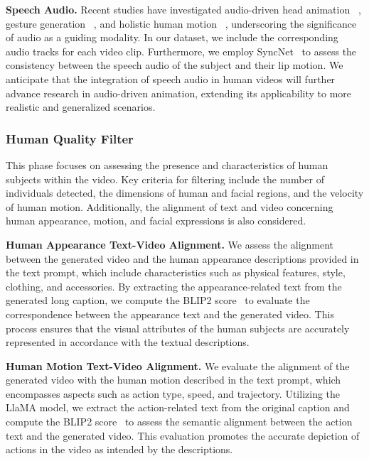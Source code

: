 \noindent\textbf{Speech Audio.}  
Recent studies have investigated audio-driven head animation ~\cite{xu2024hallo,xu2024vasa,he2023gaia}, gesture generation ~\cite{yang2023qpgesture,zhu2023taming}, and holistic human motion ~\cite{corona2024vlogger,wang2024dance}, underscoring the significance of audio as a guiding modality. 
In our dataset, we include the corresponding audio tracks for each video clip. 
Furthermore, we employ SyncNet~\cite{raina2022syncnet} to assess the consistency between the speech audio of the subject and their lip motion. 
We anticipate that the integration of speech audio in human videos will further advance research in audio-driven animation, extending its applicability to more realistic and generalized scenarios.





\subsubsection{Human Quality Filter}
\label{sec:caption_refine}

This phase focuses on assessing the presence and characteristics of human subjects within the video. Key criteria for filtering include the number of individuals detected, the dimensions of human and facial regions, and the velocity of human motion. Additionally, the alignment of text and video concerning human appearance, motion, and facial expressions is also considered.






\noindent\textbf{Human Appearance Text-Video Alignment.}
We assess the alignment between the generated video and the human appearance descriptions provided in the text prompt, which include characteristics such as physical features, style, clothing, and accessories. 
By extracting the appearance-related text from the generated long caption, we compute the BLIP2 score~\cite{li2023blip} to evaluate the correspondence between the appearance text and the generated video. 
This process ensures that the visual attributes of the human subjects are accurately represented in accordance with the textual descriptions.






\noindent\textbf{Human Motion Text-Video Alignment.}
We evaluate the alignment of the generated video with the human motion described in the text prompt, which encompasses aspects such as action type, speed, and trajectory. 
Utilizing the LlaMA model, we extract the action-related text from the original caption and compute the BLIP2 score~\cite{li2023blip} to assess the semantic alignment between the action text and the generated video. 
This evaluation promotes the accurate depiction of actions in the video as intended by the descriptions.

